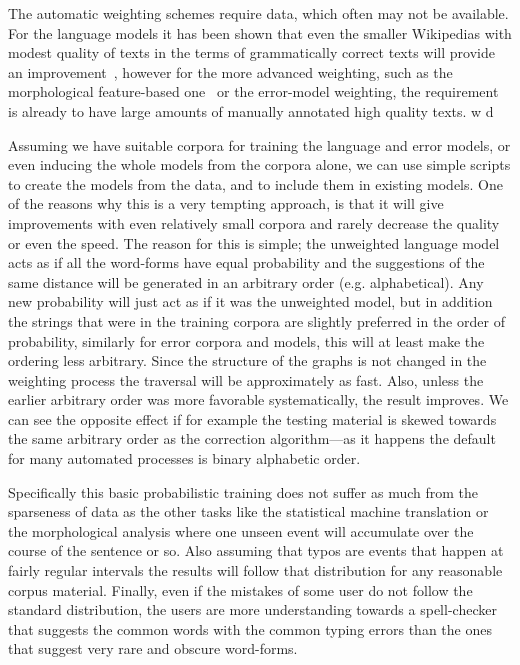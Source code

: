 \documentclass[a4paper,12pt]{article}
\begin{document}
The automatic weighting schemes require data, which often may not be available.
For the language models it has been shown that even the smaller Wikipedias
with modest quality of texts in the terms of grammatically correct texts will
provide an improvement~\cite[]{pirinen/2010/lrec}, however for the more
advanced weighting, such as the morphological feature-based
one~\cite[]{pirinen2012improving} or the error-model weighting, the requirement
is already to have large amounts of manually annotated high quality texts. 
w%
d%

Assuming we have suitable corpora for training the language and error models,
or even inducing the whole models from the corpora alone, we can use simple
scripts to create the models from the data, and to include them in existing
models. One of the reasons why this is a very tempting approach, is that it
will give improvements with even relatively small corpora and rarely decrease
the quality or even the speed. The reason for this is simple; the unweighted
language model acts as if all the word-forms have equal probability and the
suggestions of the same distance will be generated in an arbitrary order (e.g.
alphabetical). Any new probability will just act as if it was the unweighted
model, but in addition the strings that were in the training corpora are
slightly preferred in the order of probability, similarly for error corpora and
models, this will at least make the ordering less arbitrary. Since the
structure of the graphs is not changed in the weighting process the traversal
will be approximately as fast. Also, unless the earlier arbitrary order was
more favorable systematically, the result improves. We can see the opposite
effect if for example the testing material is skewed towards the same arbitrary
order as the correction algorithm---as it happens the default for many
automated processes is binary alphabetic order.

Specifically this basic probabilistic training does not suffer as much from the
sparseness of data as the other tasks like the statistical machine translation
or the morphological analysis where one unseen event will accumulate over the
course of the sentence or so. Also assuming that typos are events that happen
at fairly regular intervals the results will follow that distribution for any
reasonable corpus material. Finally, even if the mistakes of some user do not
follow the standard distribution, the users are more understanding towards a
spell-checker that suggests the common words with the common typing errors than
the ones that suggest very rare and obscure word-forms.
\end{document}
